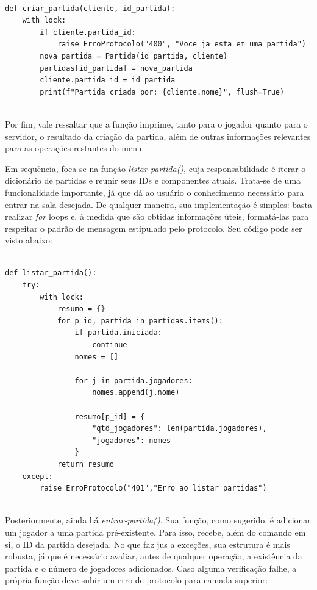\documentclass[11pt,a4paper]{article}
\begin{document}
\begin{verbatim}

def criar_partida(cliente, id_partida):
    with lock:
        if cliente.partida_id:
            raise ErroProtocolo("400", "Voce ja esta em uma partida")
        nova_partida = Partida(id_partida, cliente)
        partidas[id_partida] = nova_partida
        cliente.partida_id = id_partida
        print(f"Partida criada por: {cliente.nome}", flush=True)
        
\end{verbatim}

Por fim, vale ressaltar que a função imprime, tanto para o jogador quanto para o servidor, o resultado da criação da partida, além de outras informações relevantes para as operações restantes do menu.

Em sequência, foca-se na função \textit{listar-partida()}, cuja responsabilidade é iterar o dicionário de partidas e reunir seus IDs e componentes atuais. Trata-se de uma funcionalidade importante, já que dá ao usuário o conhecimento necessário para entrar na sala desejada. De qualquer maneira, sua implementação é simples: basta realizar \textit{for} loops e, à medida que são obtidas informações úteis, formatá-las para respeitar o padrão de mensagem estipulado pelo protocolo. Seu código pode ser visto abaixo:

\begin{verbatim}

def listar_partida():
    try:
        with lock:
            resumo = {}
            for p_id, partida in partidas.items():
                if partida.iniciada:
                    continue
                nomes = []

                for j in partida.jogadores:
                    nomes.append(j.nome)

                resumo[p_id] = {
                    "qtd_jogadores": len(partida.jogadores),
                    "jogadores": nomes
                }
            return resumo
    except:
        raise ErroProtocolo("401","Erro ao listar partidas")
    
\end{verbatim}

Posteriormente, ainda há \textit{entrar-partida()}. Sua função, como sugerido, é adicionar um jogador a uma partida pré-existente. Para isso, recebe, além do comando em si, o ID da partida desejada. No que faz jus a exceções, sua estrutura é mais robusta, já que é necessário avaliar, antes de qualquer operação, a existência da partida e o número de jogadores adicionados. Caso alguma verificação falhe, a própria função deve subir um erro de protocolo para camada superior:
\end{document}
